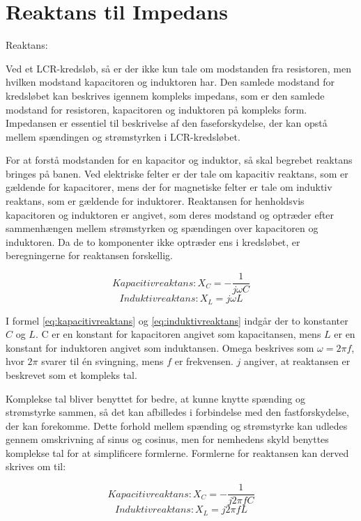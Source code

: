 \section{Reaktans til Impedans}
Reaktans:

Ved et LCR-kredsløb, så er der ikke kun tale om modstanden fra resistoren, men hvilken modstand kapacitoren og induktoren har. Den samlede modstand for kredsløbet kan beskrives igennem kompleks impedans, som er den samlede modstand for resistoren, kapacitoren og induktoren på kompleks form. Impedansen er essentiel til beskrivelse af den faseforskydelse, der kan opstå mellem spændingen og strømstyrken i LCR-kredsløbet.

For at forstå modstanden for en kapacitor og induktor, så skal begrebet reaktans bringes på banen. Ved elektriske felter er der tale om kapacitiv reaktans, som er gældende for kapacitorer, mens der for magnetiske felter er tale om induktiv reaktans, som er gældende for induktorer. Reaktansen for henholdsvis kapacitoren og induktoren er angivet, som deres modstand og optræder efter sammenhængen mellem strømstyrken og spændingen over kapacitoren og induktoren. Da de to komponenter ikke optræder ens i kredsløbet, er beregningerne for reaktansen forskellig.

\begin{equation}
Kapacitiv reaktans: X_C = - \frac{1}{j \omega C}
\label{eq:kapacitivreaktans}
\end{equation}
\begin{equation}
Induktiv reaktans: X_L = j \omega L
\label{eq:induktivreaktans}
\end{equation}

I formel \ref{eq:kapacitivreaktans} og \ref{eq:induktivreaktans} indgår der to konstanter $C$ og $L$. C er en konstant for kapacitoren angivet som kapacitansen, mens $L$ er en konstant for induktoren angivet som induktansen. Omega beskrives som $\omega = 2 \pi f$, hvor $2 \pi$ svarer til én svingning, mens $f$ er frekvensen. $j$ angiver, at reaktansen er beskrevet som et kompleks tal.

Komplekse tal bliver benyttet for bedre, at kunne knytte spænding og strømstyrke sammen, så det kan afbilledes i forbindelse med den fastforskydelse, der kan forekomme. Dette forhold mellem spænding og strømstyrke kan udledes gennem omskrivning af sinus og cosinus, men for nemhedens skyld benyttes komplekse tal for at simplificere formlerne. Formlerne for reaktansen kan derved skrives om til:

\begin{equation} 
Kapacitiv reaktans: X_C = - \frac{1}{j 2 \pi f C}
\end{equation}
\begin{equation}
Induktiv reaktans: X_L = j 2 \pi f L
\end{equation}

